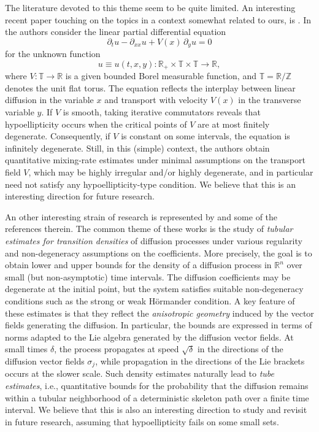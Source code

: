 \documentclass[11pt, a4paper,leqno]{amsart}
\theoremstyle{definition}
\numberwithin{equation}{section}
\begin{document}
The literature devoted to this theme  seem to be quite limited. An interesting recent paper touching on the topics in a context somewhat related to ours, is \cite{DouSalortSmets2025}. In \cite{DouSalortSmets2025} the authors
consider  the linear partial differential equation
\[
\partial_t u - \partial_{xx} u + V(x)\,\partial_y u = 0
\]
for the unknown function
\[
u \equiv u(t,x,y) : \mathbb{R}_+ \times \mathbb{T} \times \mathbb{T} \to \mathbb{R},
\]
where \(V:\mathbb{T}\to\mathbb{R}\) is a given bounded Borel measurable function, and \(\mathbb{T}=\mathbb{R}/\mathbb{Z}\) denotes the unit flat torus. The equation reflects the interplay between linear diffusion in the variable
\(x\) and transport with velocity \(V(x)\) in the transverse variable \(y\). If  \(V\) is smooth, taking iterative commutators reveals that hypoellipticity
occurs when the critical points of \(V\) are at most finitely degenerate. Consequently, if $V$ is constant on some intervals, the equation is infinitely degenerate. Still, in this (simple) context, the authors obtain quantitative mixing-rate estimates under minimal assumptions on the transport field $V$, which may be
highly irregular and/or highly degenerate, and in particular need not satisfy
any hypoellipticity-type condition. We believe that this is an interesting direction for future research.

An other interesting strain of research is represented by \cite{BallyCaramellino2013,BallyCaramellinoPigato2022a,BallyCaramellinoPigato2022b,Pigato2022,Pigato2017} and some of the references therein. The common theme of these works is the study of \emph{tubular estimates for transition densities} of diffusion processes under various regularity and non-degeneracy assumptions on the coefficients. More precisely, the goal is to obtain lower and upper bounds for the density of a diffusion process in $\mathbb{R}^n$ over small (but non-asymptotic) time intervals. The diffusion coefficients may be degenerate at the initial point, but the system satisfies suitable non-degeneracy conditions such as the strong or weak H\"ormander condition. A key feature of these estimates is that they reflect the \emph{anisotropic geometry} induced by the vector fields generating the diffusion. In particular, the bounds are expressed in terms of norms adapted to the Lie algebra generated by the diffusion vector fields. At small times $\delta$, the process propagates at speed $\sqrt{\delta}$ in the directions of the diffusion vector fields $\sigma_j$, while propagation in the directions of the  Lie brackets  occurs at the slower scale. Such density estimates naturally lead to \emph{tube estimates}, i.e., quantitative bounds for the probability that the diffusion remains within a tubular neighborhood of a deterministic skeleton path over a finite time interval. We believe that this is also an interesting direction to study and revisit in future research,  assuming that hypoellipticity fails on some small sets.
\end{document}
